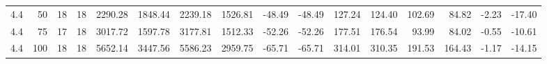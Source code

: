 \begin{table*}[htb!]
\begin{tabular}{rrrrrrrrrrrrrrrr}
        4.4           & 50    & 18    & 18     & 2290.28  & 1848.44   & 2239.18   & 1526.81    & -48.49     & -48.49      & 127.24     & 124.40      & 102.69      & 84.82        & -2.23     & -17.40     \\
        4.4           & 75    & 17    & 18     & 3017.72  & 1597.78   & 3177.81   & 1512.33    & -52.26     & -52.26      & 177.51     & 176.54      & 93.99       & 84.02        & -0.55     & -10.61     \\
        4.4           & 100   & 18    & 18     & 5652.14  & 3447.56   & 5586.23   & 2959.75    & -65.71     & -65.71      & 314.01     & 310.35      & 191.53      & 164.43       & -1.17     & -14.15     \\
        \bottomrule
    \end{tabular}
\end{table*}
